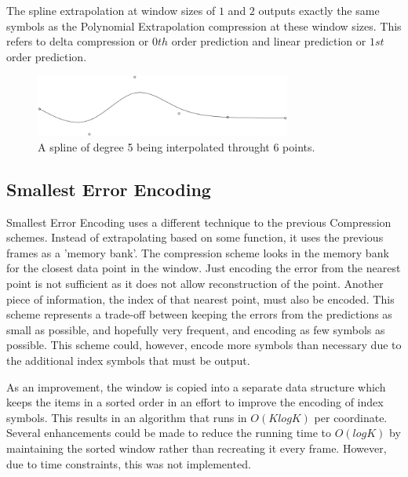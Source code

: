 \documentclass[a4paper,11pt]{report}
\begin{document}
The spline extrapolation at window sizes of $1$ and $2$ outputs exactly the same symbols as the Polynomial Extrapolation compression at these window sizes. This refers to delta compression or $0th$ order prediction and linear prediction or $1st$ order prediction.  

\begin{figure}
 \center
 \includegraphics[width=0.75\textwidth]{resources/SplineInterpolation.png}
\caption{A spline of degree 5 being interpolated throught 6 points. }
\label{SplineDescrip}
\end{figure}

\subsection{Smallest Error Encoding}

Smallest Error Encoding uses a different technique to the previous Compression schemes. Instead of extrapolating based on some function, it uses the previous frames as a 'memory bank'. The compression scheme looks in the memory bank for the closest data point in the window. Just encoding the error from the nearest point is not sufficient as it does not allow reconstruction of the point. Another piece of information, the index of that nearest point, must also be encoded. This scheme represents a trade-off between keeping the errors from the predictions as small as possible, and hopefully very frequent, and encoding as few symbols as possible. This scheme could, however, encode more symbols than necessary due to the additional index symbols that must be output.

As an improvement, the window is copied into a separate data structure which keeps the items in a sorted order in an effort to improve the encoding of index symbols. This results in an algorithm that runs in $O(KlogK)$ per coordinate. Several enhancements could be made to reduce the running time to $O(logK)$ by maintaining the sorted window rather than recreating it every frame. However, due to time constraints, this was not implemented.  
\end{document}
